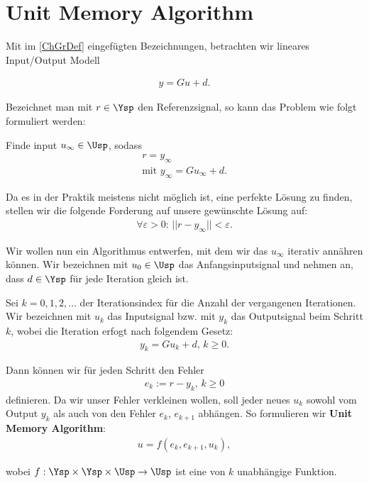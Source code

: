 \chapter{Unit Memory Algorithm}

Mit im \autoref{ChGrDef} eingefügten Bezeichnungen, betrachten wir lineares Input/Output Modell

\begin{align}
y = Gu + d.
\end{align}

Bezeichnet man mit $r \in \Ysp$ den Referenzsignal, so kann das Problem wie folgt formuliert werden: 

Finde input $u_\infty \in \Usp$, sodass 
	\begin{align}
	r= y_\infty  \\
	\text{mit } y_\infty = G u_\infty + d. \nonumber
	\end{align}
	
Da es in der Praktik meistens nicht möglich ist, eine perfekte Lösung zu finden, stellen wir die folgende Forderung auf unsere gewünschte Lösung auf: 
\begin{align}
\forall \varepsilon > 0 : \, ||r - y_\infty|| < \varepsilon. \label{conv_cr}
\end{align}

Wir wollen nun ein Algorithmus entwerfen, mit dem wir das $u_\infty$ iterativ annähren können. 
Wir bezeichnen mit $u_0 \in \Usp$ das Anfangsinputsignal und nehmen an, dass $d \in \Ysp$ für jede Iteration gleich ist. 

Sei $k = 0, 1, 2, \dots $ der Iterationsindex für die Anzahl der vergangenen Iterationen. 
Wir bezeichnen mit $u_k$ das Inputsignal bzw. mit $y_k$ das Outputsignal beim Schritt $k$, wobei die Iteration erfogt nach folgendem Gesetz:
\begin{align}
y_k = G u_k + d, \, k\geq 0.
\end{align}

Dann können wir für jeden Schritt den Fehler 
\begin{align}
e_k := r - y_k, \, k\geq 0
\end{align}
definieren. 
Da wir unser Fehler verkleinen wollen, soll jeder neues $u_k$ sowohl vom Output $y_k$ als auch von den Fehler $e_k$, $e_{k+1}$ abhängen. So formulieren wir \textbf{Unit Memory Algorithm}: 
\begin{align}
u = f(e_k, e_{k+1}, u_k),
\end{align}


wobei $f: \Ysp \times \Ysp \times \Usp \to \Usp$ ist eine von $k$ unabhängige Funktion. 

